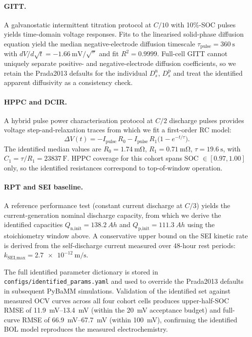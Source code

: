 \documentclass[preprint,12pt,3p,authoryear]{elsarticle}
\begin{document}
\paragraph{GITT.} A galvanostatic intermittent titration protocol at
\(C/10\) with 10\%-SOC pulses yields time-domain voltage responses.
Fits to the linearised solid-phase diffusion equation
\citep{weppner1977determination} yield the median negative-electrode
diffusion timescale \(\tau_\text{pulse} = \SI{360}{\second}\) with
\(dV/d\sqrt{t} = \SI{-1.66}{\milli\volt\per\sqrt{\second}}\) and
fit \(R^2 = 0.9999\). Full-cell GITT cannot uniquely separate positive-
and negative-electrode diffusion coefficients, so we retain the
Prada2013 defaults for the individual \(D_s^\text{n}\), \(D_s^\text{p}\)
and treat the identified apparent diffusivity as a consistency check.

\paragraph{HPPC and DCIR.} A hybrid pulse power characterisation
protocol at \(C/2\) discharge pulses provides voltage
step-and-relaxation traces from which we fit a first-order RC model:
\begin{equation}
    \Delta V(t) = -I_\text{pulse}\,R_0 -
    I_\text{pulse}\,R_1\bigl(1 - e^{-t/\tau}\bigr).
\end{equation}
The identified median values are \(R_0 = \SI{1.74}{\milli\ohm}\),
\(R_1 = \SI{0.71}{\milli\ohm}\), \(\tau = \SI{19.6}{\second}\), with
\(C_1 = \tau/R_1 = \SI{23837}{\farad}\). HPPC coverage for this cohort
spans SOC \(\in [0.97, 1.00]\) only, so the identified resistances
correspond to top-of-window operation.

\paragraph{RPT and SEI baseline.} A reference performance test (constant
current discharge at \(C/3\)) yields the current-generation nominal
discharge capacity, from which we derive the identified capacities
\(Q_\text{n,init} = \SI{138.2}{Ah}\) and
\(Q_\text{p,init} = \SI{111.3}{Ah}\) using the stoichiometry window
above. A conservative upper bound on the SEI kinetic rate is derived
from the self-discharge current measured over 48-hour rest periods:
\(k_\text{SEI,max} = \SI{2.7e-12}{\meter\per\second}\).

The full identified parameter dictionary is stored in
\texttt{configs/identified\_params.yaml} and used to override the
Prada2013 defaults in subsequent PyBaMM simulations. Validation of the
identified set against measured OCV curves across all four cohort cells
produces upper-half-SOC RMSE of \SIrange{11.9}{13.4}{\milli\volt}
(within the \SI{20}{\milli\volt} acceptance budget) and full-curve RMSE
of \SIrange{66.9}{67.7}{\milli\volt} (within \SI{100}{\milli\volt}),
confirming the identified BOL model reproduces the measured
electrochemistry.
\end{document}
